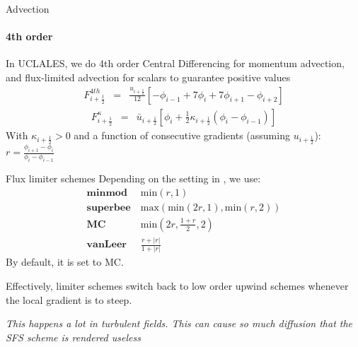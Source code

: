 \begin{frame}{Advection}
\framesubtitle{4th order}
In UCLALES, we do 4th order Central Differencing for momentum advection, and flux-limited advection for scalars to guarantee positive values
\begin{align*}
 F^{4th}_{i+\frac{1}{2}} &=& \frac{u_{i+\frac{1}{2}}}{12} \left[-\phi_{i-1} + 7 \phi_{i} + 7 \phi_{i+1} -\phi_{i+2}\right]
\end{align*}
\pause
\begin{align*}
 F_{i+\frac{1}{2}}^{\kappa} &=& \bar{u}_{i+\frac{1}{2}} \left[\phi_{i}+\frac{1}{2}\kappa_{i+\frac{1}{2}}\left(\phi_{i}-\phi_{i-1}\right)\right]
\end{align*}
With $\kappa_{i+\frac{1}{2}} > 0 $ and a function of consecutive gradients (assuming $u_{i+\frac{1}{2}}$):
$ r = \frac{\phi_{i+1} - \phi_{i}}{\phi_{i} - \phi_{i-1}} $
\end{frame}



\begin{frame}[<+->]{Flux limiter schemes}
Depending on the setting  in , we use:
\begin{align*}
 \mathrm{\mathbf{minmod}\ } & \mathrm{min}\left(r, 1\right)  \\
 \mathrm{\mathbf{superbee}\ } & \mathrm{max}\left(\mathrm{min}\left(2 r, 1\right), \mathrm{min}\left(r, 2\right)\right)\\
 \mathrm{\mathbf{MC}\ } & \mathrm{min}(2 r,\frac{1+r}{2}, 2)  \\
 \mathrm{\mathbf{vanLeer}\ } & \frac{r + |r|}{1 + |r|}
\end{align*}
By default, it is set to MC.

Effectively, limiter schemes switch back to low order upwind schemes whenever the local gradient is to steep. 

\emph{This happens a lot in turbulent fields. This can cause so much diffusion that the SFS scheme is rendered useless}
\end{frame}

